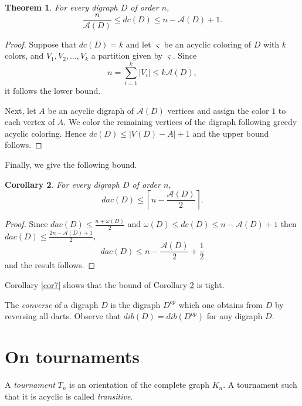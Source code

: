 \documentclass[12pt]{article}
\newtheorem{theorem}{Theorem}
\newtheorem{corollary}[theorem]{Corollary}
\begin{document}
\begin{theorem}\label{teo5}
For every digraph $D$ of order $n$,
\[\frac{n}{\mathcal{A}(D)}\leq dc(D)\leq n-\mathcal{A}(D)+1.\]
\end{theorem}
\begin{proof}
Suppose that $dc(D)=k$ and let $\varsigma$ be an acyclic coloring of $D$ with $k$ colors, and $V_1,V_2,\dots ,V_k$ a partition given by $\varsigma$. Since
\[n=\overset{k}{\underset{i=1}{\sum}}|V_i|\leq k\mathcal{A}(D),\]
it follows the lower bound.

Next, let $A$ be an acyclic digraph of $\mathcal{A}(D)$ vertices and assign the color $1$ to each vertex of $A$. We color the remaining vertices of the digraph following greedy acyclic coloring. Hence
$dc(D)\leq |V(D)-A|+1$ and the upper bound follows.
\end{proof}

Finally, we give the following bound.

\begin{corollary}\label{cor6}
For every digraph $D$ of order $n$,
\[dac(D)\leq \left\lceil n-\frac{\mathcal{A}(D)}{2}\right\rceil.\]
\end{corollary}
\begin{proof}
Since $dac(D)\leq \frac{n+\omega(D)}{2}$ and $\omega(D)\leq dc(D)\leq n-\mathcal{A}(D)+1$ then
$dac(D)\leq \frac{2n-\mathcal{A}(D)+1}{2}$,
\[dac(D)\leq n-\frac{\mathcal{A}(D)}{2}+\frac{1}{2}\] and the result follows.
\end{proof}

Corollary \ref{cor7} shows that the bound of Corollary \ref{cor6} is tight.

The \emph{converse} of a digraph $D$ is the digraph $D^{op}$ which one obtains from $D$ by reversing all darts. Observe that $dib(D)=dib(D^{op})$ for any digraph $D$.


\section{On tournaments}

A \emph{tournament} $T_n$ is an orientation of the complete graph $K_n$. A tournament such that it is acyclic is called \emph{transitive}.
\end{document}
